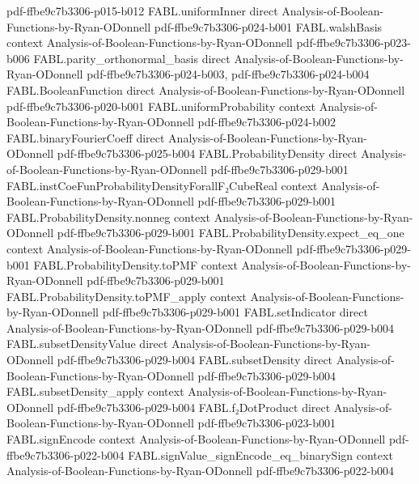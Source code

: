 \begin{theorem}
  {pdf-ffbe9c7b3306-p015-b012}
\proofstep
  {FABL.uniformInner}
  {direct}
  {Analysis-of-Boolean-Functions-by-Ryan-ODonnell}
  {pdf-ffbe9c7b3306-p024-b001}
\proofstep
  {FABL.walshBasis}
  {context}
  {Analysis-of-Boolean-Functions-by-Ryan-ODonnell}
  {pdf-ffbe9c7b3306-p023-b006}
\proofstep
  {FABL.parity_orthonormal_basis}
  {direct}
  {Analysis-of-Boolean-Functions-by-Ryan-ODonnell}
  {pdf-ffbe9c7b3306-p024-b003,
    pdf-ffbe9c7b3306-p024-b004}
\proofstep
  {FABL.BooleanFunction}
  {direct}
  {Analysis-of-Boolean-Functions-by-Ryan-ODonnell}
  {pdf-ffbe9c7b3306-p020-b001}
\proofstep
  {FABL.uniformProbability}
  {context}
  {Analysis-of-Boolean-Functions-by-Ryan-ODonnell}
  {pdf-ffbe9c7b3306-p024-b002}
\proofstep
  {FABL.binaryFourierCoeff}
  {direct}
  {Analysis-of-Boolean-Functions-by-Ryan-ODonnell}
  {pdf-ffbe9c7b3306-p025-b004}
\proofstep
  {FABL.ProbabilityDensity}
  {direct}
  {Analysis-of-Boolean-Functions-by-Ryan-ODonnell}
  {pdf-ffbe9c7b3306-p029-b001}
\proofstep
  {FABL.instCoeFunProbabilityDensityForallF₂CubeReal}
  {context}
  {Analysis-of-Boolean-Functions-by-Ryan-ODonnell}
  {pdf-ffbe9c7b3306-p029-b001}
\proofstep
  {FABL.ProbabilityDensity.nonneg}
  {context}
  {Analysis-of-Boolean-Functions-by-Ryan-ODonnell}
  {pdf-ffbe9c7b3306-p029-b001}
\proofstep
  {FABL.ProbabilityDensity.expect_eq_one}
  {context}
  {Analysis-of-Boolean-Functions-by-Ryan-ODonnell}
  {pdf-ffbe9c7b3306-p029-b001}
\proofstep
  {FABL.ProbabilityDensity.toPMF}
  {context}
  {Analysis-of-Boolean-Functions-by-Ryan-ODonnell}
  {pdf-ffbe9c7b3306-p029-b001}
\proofstep
  {FABL.ProbabilityDensity.toPMF_apply}
  {context}
  {Analysis-of-Boolean-Functions-by-Ryan-ODonnell}
  {pdf-ffbe9c7b3306-p029-b001}
\proofstep
  {FABL.setIndicator}
  {direct}
  {Analysis-of-Boolean-Functions-by-Ryan-ODonnell}
  {pdf-ffbe9c7b3306-p029-b004}
\proofstep
  {FABL.subsetDensityValue}
  {direct}
  {Analysis-of-Boolean-Functions-by-Ryan-ODonnell}
  {pdf-ffbe9c7b3306-p029-b004}
\proofstep
  {FABL.subsetDensity}
  {direct}
  {Analysis-of-Boolean-Functions-by-Ryan-ODonnell}
  {pdf-ffbe9c7b3306-p029-b004}
\proofstep
  {FABL.subsetDensity_apply}
  {context}
  {Analysis-of-Boolean-Functions-by-Ryan-ODonnell}
  {pdf-ffbe9c7b3306-p029-b004}
\proofstep
  {FABL.f₂DotProduct}
  {direct}
  {Analysis-of-Boolean-Functions-by-Ryan-ODonnell}
  {pdf-ffbe9c7b3306-p023-b001}
\proofstep
  {FABL.signEncode}
  {context}
  {Analysis-of-Boolean-Functions-by-Ryan-ODonnell}
  {pdf-ffbe9c7b3306-p022-b004}
\proofstep
  {FABL.signValue_signEncode_eq_binarySign}
  {context}
  {Analysis-of-Boolean-Functions-by-Ryan-ODonnell}
  {pdf-ffbe9c7b3306-p022-b004}

\end{theorem}
